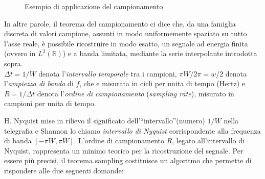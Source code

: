 \begin{figure}[H]
    \caption{Esempio di applicazione del campionamento}
\end{figure}

In altre parole, il teorema del campionamento ci dice che, da una famiglia discreta di
valori campione, assunti in modo uniformemente spaziato su tutto l’asse reale, è possibile
ricostruire in modo esatto, un segnale ad energia finita (ovvero in $L^2(\mathbb{R})$) e a
banda limitata, mediante la serie interpolante introdotta sopra.\\

$\Delta t = 1/W$ denota l’\textit{intervallo temporale} tra i campioni, $\pi W/ 2\pi = w/2$ denota
l’\textit{ampiezza di banda} di $f$, che e misurata in cicli per unita di tempo (Hertz) e
$R = 1 /\Delta t$ denota l’\textit{ordine di campionamento} (\textit{sampling rate}),
misurato in campioni per unita di tempo.

H. Nyquist mise in rilievo il significato dell’“intervallo”(numero) $1/W$ nella telegrafia
e Shannon lo chiamo \textit{intervallo di Nyquist} corrispondente alla frequenza di
banda $[−\pi W, \pi W]$. L’ordine di campionamento $R$, legato all’intervallo di Nyquist,
rappresenta un minimo teorico per la ricostruzione del segnale.
Per essere più precisi, il teorema sampling costituisce un algoritmo che permette di
rispondere alle due seguenti domande:

